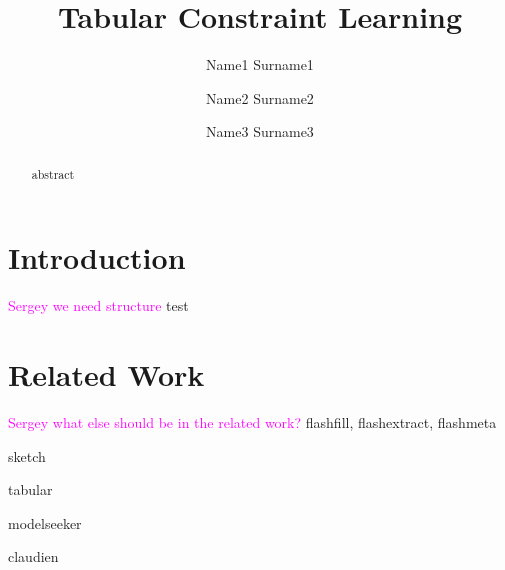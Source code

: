 \documentclass{ecai}
\newcommand{\sergey}[1]{\textcolor{magenta}{{\sc Sergey} #1}\xspace}
\begin{document}
\title{Tabular Constraint Learning}

\author{Name1 Surname1 \and Name2 Surname2 \and Name3 Surname3  }

\maketitle

\begin{abstract}
  abstract
  \end{abstract}
\section{Introduction}
\sergey{we need structure} test

\section{Related Work}
\sergey{what else should be in the related work?}
flashfill, flashextract, flashmeta \cite{flashfill,flashextract,flashmeta}

sketch \cite{sketch}

tabular \cite{tabular}

modelseeker \cite{modelseeker}

claudien \cite{claudien}

\printbibliography
\end{document}
